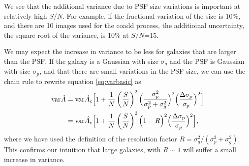 \documentclass[a4paper,fleqn,usenatbib,referee]{mnras}
\newcommand{\snr}{$S/N$}
\begin{document}
We see that the additional variance due to PSF size variations is important
at relatively high \snr.  For example, if the fractional variation of
the size is 10\%, and there are 10 images used for the coadd process,
the additioinal uncertainty, the square root of the variance,
is 10\% at \snr=15.

We may expect the increase in variance to be less for galaxies that
are larger than the PSF.  If the galaxy is a Gaussian with
size $\sigma_g$ and the PSF is Gaussian with size $\sigma_p$,
and that there are small variations in the PSF size,
we can use the chain rule to rewrite equation \ref{eq:varbasic} as
\begin{align} \label{eq:vargal}
    {\rm var}\hat{A} &= {\rm var}\hat{A_c} \Bigl[ 1 + 
        \frac{1}{N} \left( \frac{S}{N} \right)^2 \Bigl(\frac{\sigma_p^2}{\sigma_p^2 + \sigma_g^2} \Bigr)^2 \Bigl( \frac{\Delta \sigma_p}{\sigma_p} \Bigr)^2 \Bigr] \\
     &= {\rm var}\hat{A_c} \Bigl[ 1 + 
        \frac{1}{N} \left( \frac{S}{N} \right)^2 \Bigl(1 - R \Bigr)^2 \Bigl( \frac{\Delta \sigma_p}{\sigma_p} \Bigr)^2 \Bigr],
\end{align}
where we have used the definition of the resolution factor $R =
\sigma_g^2/(\sigma_p^2 + \sigma_g^2)$.  This confirms our
intuition that large galaxies, with $R \sim 1$ will suffer
a small increase in variance.



%
%
\end{document}

